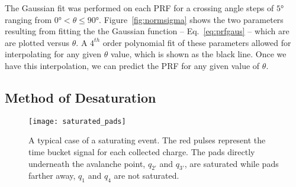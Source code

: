 \begin{comment}
\begin{table}
\centering
 \begin{tabular}{||c c c c c c||} 
 \hline
 Coefficient & $c_0$ & $c_1$ & $c_2$ & $c_3$ & $c_4$ \\ [0.5ex] 
 \hline\hline
 $0 < \theta < 45$ & & & & &  \\ [.25ex]
 \hline
 $N_0$ & .897 & 5.766E-3 & -4.263E-4 & 7.444E-6 & 5.705E-8 \\ 
 \hline
 $\sigma$ & 5.496 & -3.920E-2 & 2.693E-3 & -5.208E-5 & 5.334E-7\\
 \hline
 $45 < \theta < 90$ & & & &  & \\ [.25ex]
 \hline	
 $N_0$ & 1.220 & -6.258E-2 & 1.608E-3 & -1.492E-5  & 4.654E-8 \\
 \hline
 $\sigma$ & 31.368 & -1.109 & 1.779E-2 & -1.336E-4 & 3.940E-7\\
 \hline
\end{tabular}
\caption{Coefficients of the $4_th$ order polynomial fit to the Gaussian parameters $N_0$ and $\sigma$. The polynomial form is given as $c_0 + c_1 x + c_2 x^2 + c_3 x^3 + c_4 x^4$}
\label{tb:coeff}
\end{table}
\end{comment}
 
The Gaussian fit was performed on each PRF for a crossing angle steps of  $\ang{5}$ ranging from $\ang{0} < \theta \leq \ang{90}$. Figure~\ref{fig:normsigma} shows the two parameters resulting from fitting the the Gaussian function -- Eq.~\ref{eq:prfgaus} -- which are are plotted versus $\theta$. A $4^{th}$ order polynomial fit of these parameters allowed for interpolating for any given $\theta$ value, which is shown as the black line. Once we have this interpolation, we can predict the PRF for any given value of $\theta$. 


\subsection{Method of Desaturation}
\label{sec:desat}

\begin{figure}[ht!]
\texttt{[image: saturated\_pads]}
\caption{A typical case of a saturating event. The red pulses represent the time bucket signal for each collected charge. The pads directly underneath the avalanche point, $q_{2'}$ and $q_{3'}$, are saturated while pads farther away, $q_1$ and $q_4$ are not saturated.}
\label{fig:satpad}
\end{figure}


